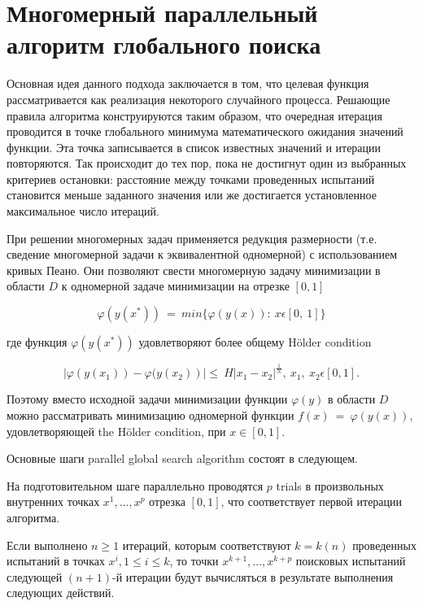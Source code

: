 \documentclass{svproc}
\begin{document}
\section{Многомерный параллельный алгоритм глобального поиска}

Основная идея данного подхода заключается в том, что целевая функция рассматривается как реализация некоторого случайного процесса. Решающие правила алгоритма конструируются таким образом, что очередная итерация проводится в точке глобального минимума математического ожидания значений функции. Эта точка записывается в список известных значений и итерации повторяются. Так происходит до тех пор, пока не достигнут один из выбранных критериев остановки: расстояние между точками проведенных испытаний становится меньше заданного значения или же достигается установленное максимальное число итераций. \cite{fio_bib10}

При решении многомерных задач применяется редукция размерности (т.е. сведение многомерной задачи к эквивалентной одномерной) с использованием кривых Пеано. Они позволяют свести многомерную задачу минимизации в области $D$  к одномерной задаче минимизации на отрезке $[0, 1]$

\begin{displaymath}
\varphi(y(x^\ast))\ =\ min\{\varphi(y(x)):\ x\epsilon[0,\ 1]\}
\end{displaymath}

где функция $\varphi(y(x^\ast))$  удовлетворяют более общему H{\"o}lder condition

\begin{displaymath}
\left|\varphi (y \left(x_1\right))- \varphi (y \left(x_2\right)\right )|\le\ H\left|x_1-x_2\right|^\frac{1}{N},\ x_1,\ x_2\epsilon[0,1].
\end{displaymath}

Поэтому вместо исходной задачи минимизации функции $\varphi(y)$ в области $D$ можно рассматривать минимизацию одномерной функции $f(x)\ =\ \varphi(y(x))$, удовлетворяющей the H{\"o}lder condition, при $ x\in [0,1]$.

Основные шаги parallel global search algorithm состоят в следующем.

На подготовительном шаге параллельно проводятся $p$ trials в произвольных внутренних точках $x^1, ...,x^p$ отрезка $[0,1]$, что соответствует первой итерации  алгоритма. 

Если выполнено $n \geq 1$ итераций, которым соответствуют $k=k(n)$ проведенных испытаний в точках $x^i, 1\leq i\leq k$, то точки $x^{k+1},\ldots,x^{k+p}$ поисковых испытаний следующей $(n+1)$-й итерации будут вычисляться в результате выполнения следующих действий.
\end{document}
